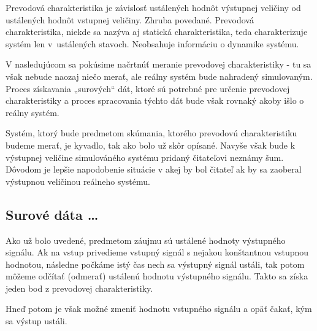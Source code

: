 \documentclass[a4paper, 10pt, ]{article}
\begin{document}


\noindent
Prevodová charakteristika je závislosť ustálených hodnôt výstupnej veličiny od ustálených hodnôt vstupnej veličiny. Zhruba povedané. Prevodová charakteristika, niekde sa nazýva aj statická charakteristika, teda charakterizuje systém len v~ustálených stavoch. Neobsahuje informáciu o dynamike systému.

V nasledujúcom sa pokúsime načrtnúť meranie prevodovej charakteristiky - tu sa však nebude naozaj niečo merať, ale reálny systém bude nahradený simulovaným. Proces získavania „surových“ dát, ktoré sú potrebné pre určenie prevodovej charakteristiky a proces spracovania týchto dát bude však rovnaký akoby išlo o reálny systém.

Systém, ktorý bude predmetom skúmania, ktorého prevodovú charakteristiku budeme merať, je kyvadlo, tak ako bolo už skôr opísané. Navyše však bude k výstupnej veličine simulováného systému pridaný čitateľovi neznámy šum. Dôvodom je lepšie napodobenie situácie v akej by bol čitateľ ak by sa zaoberal výstupnou veličinou reálneho systému.

















\subsection{Surové dáta \ldots}

Ako už bolo uvedené, predmetom záujmu sú ustálené hodnoty výstupného signálu. Ak na vstup privedieme vstupný signál s nejakou konštantnou vstupnou hodnotou, následne počkáme istý čas nech sa výstupný signál ustáli, tak potom môžeme odčítať (odmerať) ustálenú hodnotu výstupného signálu. Takto sa získa jeden bod z prevodovej charakteristiky.

Hneď potom je však možné zmeniť hodnotu vstupného signálu a opäť čakať, kým sa výstup ustáli.
\end{document}
